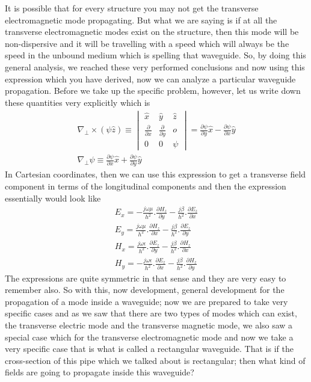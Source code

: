 It is possible that for every structure you may not get the transverse electromagnetic mode propagating. But what we are saying is if at all the transverse electromagnetic modes exist on the structure, then this mode will be non-dispersive and it will be travelling with a speed which will always be the speed in the unbound medium which is spelling that waveguide. So, by doing this general analysis, we reached these very performed conclusions and now using this expression which you have derived, now we can analyze a particular waveguide propagation. Before we take up the specific problem, however, let us write down these quantities very explicitly which is
\begin{align*}
\nabla_\bot\times(\psi\hat{z}) \equiv 
\begin{vmatrix}
\hat{x} & \hat{y} &\hat{z}\\
\frac{\partial}{\partial x} & \frac{\partial}{\partial y} & o\\
0 & 0 & \psi
\end{vmatrix} = \frac{\partial\psi}{\partial y}\hat{x} - \frac{\partial\psi}{\partial x}\hat{y}\\
\nabla_\bot\psi \equiv \frac{\partial\psi}{\partial x}\hat{x} + \frac{\partial\psi}{\partial y}\hat{y}
\end{align*}
In Cartesian coordinates, then we can use this expression to get a transverse field component in terms of the longitudinal components and then the expression essentially would look like
\begin{align*}
E_x = -\frac{j\omega\mu}{h^2}.\frac{\partial H_z}{\partial y} - \frac{j\beta}{h^2}.\frac{\partial E_z}{\partial x}\\
E_y = \frac{j\omega\mu}{h^2}.\frac{\partial H_z}{\partial x} - \frac{j\beta}{h^2}.\frac{\partial E_z}{\partial y}\\
H_x = \frac{j\omega\epsilon}{h^2}.\frac{\partial E_z}{\partial y} - \frac{j\beta}{h^2}.\frac{\partial H_z}{\partial x}\\
H_y = -\frac{j\omega\epsilon}{h^2}.\frac{\partial E_z}{\partial x} - \frac{j\beta}{h^2}.\frac{\partial H_z}{\partial y}
\end{align*}
The expressions are quite symmetric in that sense and they are very easy to remember also. So with this, now development, general development for the propagation of a mode inside a waveguide; now we are prepared to take very specific cases and as we saw that there are two types of modes which can exist, the transverse electric mode and the transverse magnetic mode, we also saw a special case which for the transverse electromagnetic mode and now we take a very specific case that is what is called a rectangular waveguide. That is if the cross-section of this pipe which we talked about is rectangular; then what kind of fields are going to propagate inside this waveguide?